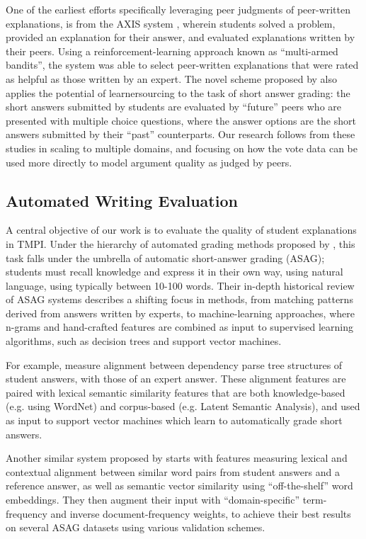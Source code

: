\documentclass[notitlepage,12pt]{jedm}
\begin{document}
One of the earliest efforts specifically leveraging peer judgments of 
peer-written explanations, is from the AXIS system \cite{williams_axis:_2016}, 
wherein students solved a problem, provided an explanation for their answer, 
and evaluated explanations written by their peers.
Using a reinforcement-learning approach known as ``multi-armed bandits'', the 
system was able to select peer-written explanations that were rated as helpful 
as those written by an expert.
The novel scheme proposed by \cite{kolhe_peer_2016} also applies the potential 
of learnersourcing to the task of short answer grading: the short answers 
submitted by students are evaluated by ``future'' peers who are presented with 
multiple choice questions, where the answer options are the short answers 
submitted by their ``past'' counterparts.
Our research follows from these studies in scaling to multiple domains, and 
focusing on how the vote data can be used more directly to model argument 
quality as judged by peers.



\subsection{Automated Writing Evaluation}

A central objective of our work is to evaluate the quality of student 
explanations in TMPI.
Under the hierarchy of automated grading methods proposed by  
\cite{burrows_eras_2015}, this task falls under the umbrella of automatic 
short-answer grading (ASAG); students must recall knowledge and express it 
in their own way, using natural language, using typically between 10-100 words. 
Their in-depth historical review of ASAG systems describes a shifting focus in 
methods, from matching patterns derived from answers written by experts, to 
machine-learning approaches, where n-grams and hand-crafted features are 
combined as input to supervised learning algorithms, such as decision trees and 
support vector machines.

For example, \cite{mohler_learning_2011} measure alignment between dependency 
parse tree structures of student answers, with those of an expert answer.
These alignment features are paired with lexical semantic similarity features 
that are both knowledge-based (e.g. using WordNet) and corpus-based (e.g. 
Latent Semantic Analysis), and used as input to support vector machines which 
learn to automatically grade short answers.

Another similar system proposed by \cite{sultan_fast_2016} starts with features 
measuring lexical and contextual alignment between similar word pairs from 
student answers and a reference answer, as well as semantic vector similarity 
using ``off-the-shelf'' word embeddings.  
They then augment their input with  ``domain-specific'' term-frequency and 
inverse document-frequency weights, to achieve their best results on several 
ASAG datasets using various validation schemes.
 
\end{document}
